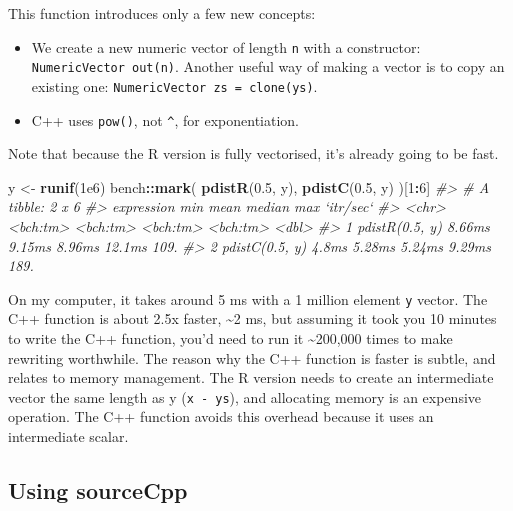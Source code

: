 \documentclass[]{book}
\newenvironment{Shaded}{\begin{snugshade}}{\end{snugshade}}
\newcommand{\CommentTok}[1]{\textcolor[rgb]{0.37,0.37,0.37}{\textit{#1}}}
\newcommand{\DecValTok}[1]{\textcolor[rgb]{0.06,0.06,0.06}{#1}}
\newcommand{\FloatTok}[1]{\textcolor[rgb]{0.06,0.06,0.06}{#1}}
\newcommand{\KeywordTok}[1]{\textcolor[rgb]{0.27,0.27,0.27}{\textbf{#1}}}
\newcommand{\NormalTok}[1]{#1}
\newcommand{\OperatorTok}[1]{\textcolor[rgb]{0.43,0.43,0.43}{\textbf{#1}}}
\newcommand{\StringTok}[1]{\textcolor[rgb]{0.5,0.5,0.5}{#1}}
\begin{document}
This function introduces only a few new concepts:

\begin{itemize}
\item
  We create a new numeric vector of length \texttt{n} with a constructor:
  \texttt{NumericVector\ out(n)}. Another useful way of making a vector is to copy an
  existing one: \texttt{NumericVector\ zs\ =\ clone(ys)}.
\item
  C++ uses \texttt{pow()}, not \texttt{\^{}}, for exponentiation.
\end{itemize}

Note that because the R version is fully vectorised, it's already going to be fast.

\begin{Shaded}
\begin{Highlighting}[]
\NormalTok{y <-}\StringTok{ }\KeywordTok{runif}\NormalTok{(}\FloatTok{1e6}\NormalTok{)}
\NormalTok{bench}\OperatorTok{::}\KeywordTok{mark}\NormalTok{(}
  \KeywordTok{pdistR}\NormalTok{(}\FloatTok{0.5}\NormalTok{, y),}
  \KeywordTok{pdistC}\NormalTok{(}\FloatTok{0.5}\NormalTok{, y)}
\NormalTok{)[}\DecValTok{1}\OperatorTok{:}\DecValTok{6}\NormalTok{]}
\CommentTok{#> # A tibble: 2 x 6}
\CommentTok{#>   expression          min     mean   median      max `itr/sec`}
\CommentTok{#>   <chr>          <bch:tm> <bch:tm> <bch:tm> <bch:tm>     <dbl>}
\CommentTok{#> 1 pdistR(0.5, y)   8.66ms   9.15ms   8.96ms   12.1ms      109.}
\CommentTok{#> 2 pdistC(0.5, y)    4.8ms   5.28ms   5.24ms   9.29ms      189.}
\end{Highlighting}
\end{Shaded}

On my computer, it takes around 5 ms with a 1 million element \texttt{y} vector. The C++ function is about 2.5x faster, \textasciitilde{}2 ms, but assuming it took you 10 minutes to write the C++ function, you'd need to run it \textasciitilde{}200,000 times to make rewriting worthwhile. The reason why the C++ function is faster is subtle, and relates to memory management. The R version needs to create an intermediate vector the same length as y (\texttt{x\ -\ ys}), and allocating memory is an expensive operation. The C++ function avoids this overhead because it uses an intermediate scalar.

\hypertarget{sourceCpp}{%
\subsection{Using sourceCpp}\label{sourceCpp}}
\end{document}
